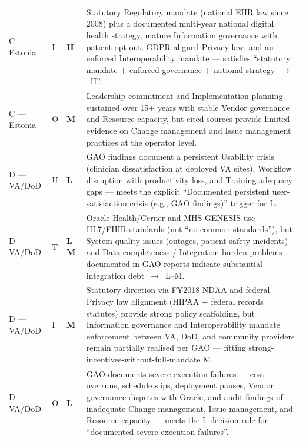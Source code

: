 \begin{longtable}{p{2.8cm} p{0.8cm} >{\centering\arraybackslash}p{1.4cm} p{9.6cm}}
\rowcolor{rowgray}
C --- Estonia & I & \cellcolor{highgreen}\textcolor{highgreentext}{\textbf{H}} &
Statutory Regulatory mandate (national EHR law since 2008) plus a documented multi-year
national digital health strategy, mature Information governance with patient opt-out,
GDPR-aligned Privacy law, and an enforced Interoperability mandate --- satisfies
``statutory mandate + enforced governance + national strategy~$\rightarrow$~H''. \\

C --- Estonia & O & \cellcolor{medamber}\textcolor{medambertext}{\textbf{M}} &
Leadership commitment and Implementation planning sustained over 15+ years with stable
Vendor governance and Resource capacity, but cited sources provide limited evidence on
Change management and Issue management practices at the operator level. \\

\rowcolor{rowgray}
D --- VA/DoD & U & \cellcolor{lowred}\textcolor{lowredtext}{\textbf{L}} &
GAO findings document a persistent Usability crisis (clinician dissatisfaction at
deployed VA sites), Workflow disruption with productivity loss, and Training adequacy
gaps --- meets the explicit ``Documented persistent user-satisfaction crisis
(e.g., GAO findings)'' trigger for L. \\

D --- VA/DoD & T & \cellcolor{lowred}\textcolor{lowredtext}{\textbf{L--M}} &
Oracle Health/Cerner and MHS GENESIS use HL7/FHIR standards (not ``no common standards''),
but System quality issues (outages, patient-safety incidents) and Data completeness /
Integration burden problems documented in GAO reports indicate substantial
integration debt~$\rightarrow$~L--M. \\

\rowcolor{rowgray}
D --- VA/DoD & I & \cellcolor{medamber}\textcolor{medambertext}{\textbf{M}} &
Statutory direction via FY2018 NDAA and federal Privacy law alignment (HIPAA + federal
records statutes) provide strong policy scaffolding, but Information governance and
Interoperability mandate enforcement between VA, DoD, and community providers remain
partially realised per GAO --- fitting strong-incentives-without-full-mandate M. \\

D --- VA/DoD & O & \cellcolor{lowred}\textcolor{lowredtext}{\textbf{L}} &
GAO documents severe execution failures --- cost overruns, schedule slips, deployment
pauses, Vendor governance disputes with Oracle, and audit findings of inadequate
Change management, Issue management, and Resource capacity --- meets the L decision
rule for ``documented severe execution failures''. \\

\end{longtable}


